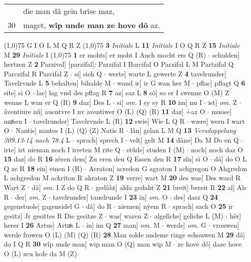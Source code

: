 \documentclass[8pt,a4paper,notitlepage]{article}
\begin{document}
\begin{table}[ht]
\begin{minipage}[t]{0.5\linewidth}
\begin{tabular}{rl}
 & die man dâ gein brîse maz,\\ 
30 & maget, \textbf{wîp unde man ze hove dô} az.\\ 
\end{tabular}
\scriptsize
\line(1,0){75} \newline
G I O L M Q R Z \newline
\line(1,0){75} \newline
\textbf{3} \textit{Initiale} L  \textbf{11} \textit{Initiale} I O Q R Z  \textbf{15} \textit{Initiale} M  \textbf{29} \textit{Initiale} I  \newline
\line(1,0){75} \newline
\textbf{1} er mohts] er moht I Auch mocht ers Q (R)  $\cdot$ schulden] hertzen Z \textbf{2} Parzival] [parzifal]: Parzifal I Barcifal O Parzifal L M Partzifal Q Parczifal R Parcifal Z  $\cdot$ si] sich Q  $\cdot$ werte] warte L gewerte Z \textbf{4} tavelrunder] Tavelrvnde L \textbf{5} behalten] bihalde M  $\cdot$ wand ir] ir G wan her M  $\cdot$ pflac] pflagt Q \textbf{6} site] si O  $\cdot$ lac] lag vnd des pflag R \textbf{7} az] saz L \textbf{8} sô] so er I swenne O (M) Z wenne L wan er Q (R) \textbf{9} daz] Des L  $\cdot$ si] \textit{om.} I sy sy R \textbf{10} im] nu I  $\cdot$ ist] \textit{om.} Z  $\cdot$ âventiure nû] auentvre I nv aventiwer O (L) (Q) (R) \textbf{11} daz] ÷az O  $\cdot$ muose] muͤsen I  $\cdot$ tavelrunder] Tavelrvnde L (R) \textbf{12} swie] Wie L Q R  $\cdot$ wære] wern I wart O  $\cdot$ Nantis] nantes I (L) (Q) (Z) Natis R  $\cdot$ lân] gelan L M Q \textbf{13} \textit{Versdoppelung 309.13-14 nach 78.4} L   $\cdot$ sprach] sprech I  $\cdot$ velt] gelt M \textbf{14} dâne] Da M Do en Q  $\cdot$ irte] irt nieman noch I irreten M rite Q  $\cdot$ stûde] studen I (M)  $\cdot$ noch] noch daz O \textbf{15} daz] do R \textbf{16} zêren dem] Zu eren den Q Essen den R \textbf{17} sîn] si O  $\cdot$ dâ] do O L Q ze R \textbf{18} ein] einen I (R)  $\cdot$ Acraton] acredon G agraton I achgregon O Ahgredon L achgredon M ackriton R akraton Z \textbf{19} verre] wart M \textbf{20} des was] Des ward R Wart Z  $\cdot$ dâ] \textit{om.} I Z do Q R  $\cdot$ gedâht] alda gedaht Z \textbf{21} breit] bereit R \textbf{22} al] Als R  $\cdot$ der] \textit{om.} Z  $\cdot$ tavelrunder] tauelrunde I \textbf{23} in] \textit{om.} O  $\cdot$ des] dasz Q \textbf{24} gegenstuole] gagensidel G  $\cdot$ dâ] do R  $\cdot$ niemen] nẏem R  $\cdot$ sprach] sach O \textbf{25} ir gesitz] Jr gesittes R Die gesitze Z  $\cdot$ was] waren Z  $\cdot$ algelîche] geliche L (M)  $\cdot$ hêr] herer I \textbf{26} Artus] Artuͯs L  $\cdot$ in] im Q \textbf{27} man] \textit{om.} M  $\cdot$ werde] \textit{om.} G  $\cdot$ vrouwen] werde frowen O (L) (M) (Q) (R) \textbf{28} Man solde andeme ringe schouwen M \textbf{29} dâ] do I Q R \textbf{30} wîp unde man] wip man O (Q) man wip M  $\cdot$ ze hove dô] daze hove O (L) zcu hofe da M (Z) \newline

\end{minipage}
\end{table}
\end{document}
